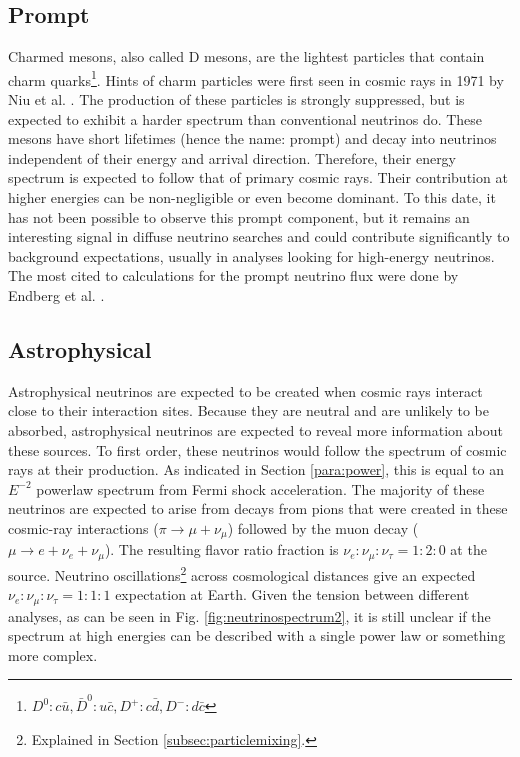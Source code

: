 \subsection{Prompt}
Charmed mesons, also called D mesons, are the lightest particles that contain charm quarks\footnote{$D^0: c\bar{u}, \bar{D}^0: u\bar{c}, D^+: c\bar{d}, D^-: d\bar{c}$}. Hints of charm particles were first seen in cosmic rays in 1971 by Niu et al. \cite{doi:10.1143/PTP.46.1644}. The production of these particles is strongly suppressed, but is expected to exhibit a harder spectrum than conventional neutrinos do. These mesons have short lifetimes (hence the name: prompt) and decay into neutrinos independent of their energy and arrival direction. Therefore, their energy spectrum is expected to follow that of primary cosmic rays. Their contribution at higher energies can be non-negligible or even become dominant. To this date, it has not been possible to observe this prompt component, but it remains an interesting signal in diffuse neutrino searches and could contribute significantly to background expectations, usually in analyses looking for high-energy neutrinos. The most cited to calculations for the prompt neutrino flux were done by Endberg et al. \cite{Enberg:2008te}.
\subsection{Astrophysical}
\label{subsec:astro}
Astrophysical neutrinos are expected to be created when cosmic rays interact close to their interaction sites. Because they are neutral and are unlikely to be absorbed, astrophysical neutrinos are expected to reveal more information about these sources. To first order, these neutrinos would follow the spectrum of cosmic rays at their production. As indicated in Section \ref{para:power}, this is equal to an $E^{-2}$ powerlaw spectrum from Fermi shock acceleration. The majority of these neutrinos are expected to arise from decays from pions that were created in these cosmic-ray interactions ($\pi \rightarrow \mu + \nu_\mu$) followed by the muon decay ($\mu \rightarrow e + \nu_e + \nu_\mu$). The resulting flavor ratio fraction is $\nu_e: \nu_\mu: \nu_\tau = 1:2:0$ at the source. Neutrino oscillations\footnote{Explained in Section \ref{subsec:particlemixing}.} across cosmological distances give an expected $\nu_e: \nu_\mu: \nu_\tau = 1:1:1$ expectation at Earth. Given the tension between different analyses, as can be seen in Fig. \ref{fig:neutrinospectrum2}, it is still unclear if the spectrum at high energies can be described with a single power law or something more complex.

